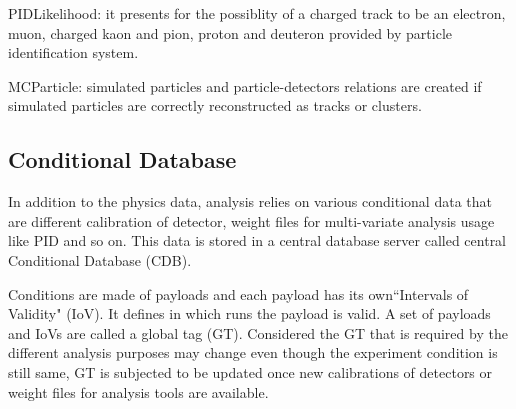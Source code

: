 \textbullet \space PIDLikelihood: it presents for the possiblity of a charged track to be an electron, muon, charged kaon and pion, proton and deuteron provided by particle identification system. 

\begin{comment}
\textbullet \space ECLCluster: reconstructed cluster in ECL detector. It consists of energy deposition and hit positions as well as other hit shape related variables. If a cluster is matched with an extrapolated track, a relation between them will also be created. 

\textbullet \space Reconstructed cluster KLM detector. It consists of momentum and position measurement. If a cluster is matched with an extrapolated track, a relation between them will also be created. 

\textbullet \space KLId: $K_L^0$ candidates with the particle identification as related to KLM and ECL clusters. 

\textbullet \space TRGSummary: L1 trigger information. 

\textbullet \space SoftwareTriggerResult: HLT information mapped by trigger names to trigger results. 
\end{comment}

\textbullet \space  MCParticle: simulated particles and particle-detectors relations are
created if simulated particles are correctly reconstructed as
tracks or clusters.
 

\subsection{Conditional Database}

In addition to the physics data, analysis relies on various conditional data that are different calibration of detector, weight files for multi-variate analysis usage like PID and so on. This data is stored in a central database server called central Conditional Database (CDB)\cite{BASF2}. 

Conditions are made of payloads and each payload has its own``Intervals of Validity" (IoV). It defines in which runs the payload is valid. A set of payloads and IoVs are called a global tag (GT). Considered the GT that is required by the different analysis purposes may change even though the experiment condition is still same, GT is subjected to be updated once new calibrations of detectors or weight files for analysis tools are available.

